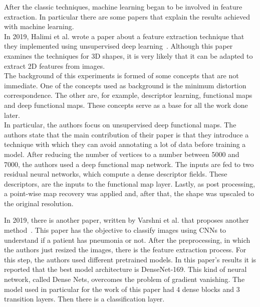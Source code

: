 \documentclass[conference]{IEEEtran}
\begin{document}
					After the classic techniques, machine learning began to be involved in feature extraction. In particular there are some papers that explain the results achieved with machine learning.\\
					In 2019, Halimi et al. wrote a paper about a feature extraction technique that they implemented using unsupervised deep learning~\cite{halimi2019unsupervised}. Although this paper examines the techniques for 
					3D shapes, it is very likely that it can be adapted to extract 2D features from images.\\
					The background of this experiments is formed of some concepts that are not immediate. One of the concepts used as background is the minimum distortion correspondence. The other are, for example, 
					descriptor learning, functional maps and deep functional maps. These concepts serve as a base for all the work done later. \\
					In particular, the authors focus on unsupervised deep functional maps. The authors state that the main contribution of their paper is that they introduce a technique with which they can 
					avoid annotating a lot of data before training a model. After reducing the number of vertices to a number between 5000 and 7000, the authors used a deep functional map network. The inputs are 
					fed to two residual neural networks, which compute a dense descriptor fields. These descriptors, are the inputs to the functional map layer. Lastly, as post processing, a point-wise map recovery was 
					applied and, after that, the shape was upscaled to the original resolution. 
					
					\noindent In 2019, there is another paper, written by Varshni et al. that proposes another method~\cite{varshni2019pneumonia}. This paper has the objective to classify images using CNNs to understand if a patient 
					has pneumonia or not. After the preprocessing, in which the authors just resized the images, there is the feature extraction process. For this step, the authors used different pretrained models.
					In this paper's results it is reported that the best model architecture is DenseNet-169. This kind of neural network, called Dense Nets, overcomes the problem of gradient vanishing. The model used in 
					particular for the work of this paper had 4 dense blocks and 3 transition layers. Then there is a classification layer. 
					
\end{document}
